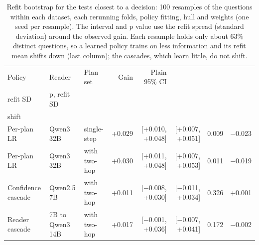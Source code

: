 \begin{table}[t]
\centering\small
\setlength{\tabcolsep}{4pt}
\caption{Refit bootstrap for the tests closest to a decision: 100 resamples of the questions within each dataset, each rerunning folds, policy fitting, hull and weights (one seed per resample). The interval and p value use the refit spread (standard deviation) around the observed gain. Each resample holds only about 63\% distinct questions, so a learned policy trains on less information and its refit mean shifts down (last column); the cascades, which learn little, do not shift.}
\label{tab:review_refit}
\begin{tabular*}{\linewidth}{@{\extracolsep{\fill}}lllrrrrr}
\toprule
Policy & Reader & Plan set & Gain & Plain 95\% CI & \begin{tabular}[b]{@{}r@{}}Gain +/- 1.96 \\ refit SD\end{tabular} & p, refit SD & \begin{tabular}[b]{@{}r@{}}Refit mean \\ shift\end{tabular} \\
\midrule
Per-plan LR & Qwen3 32B & single-step & +0.029 & [+0.010, +0.048] & [+0.007, +0.051] & 0.009 & $-$0.023 \\
Per-plan LR & Qwen3 32B & with two-hop & +0.030 & [+0.011, +0.048] & [+0.007, +0.053] & 0.011 & $-$0.019 \\
Confidence cascade & Qwen2.5 7B & with two-hop & +0.011 & [$-$0.008, +0.030] & [$-$0.011, +0.034] & 0.326 & +0.001 \\
Reader cascade & 7B to Qwen3 14B & with two-hop & +0.017 & [$-$0.001, +0.036] & [$-$0.007, +0.041] & 0.172 & $-$0.002 \\
\bottomrule
\end{tabular*}
\end{table}
